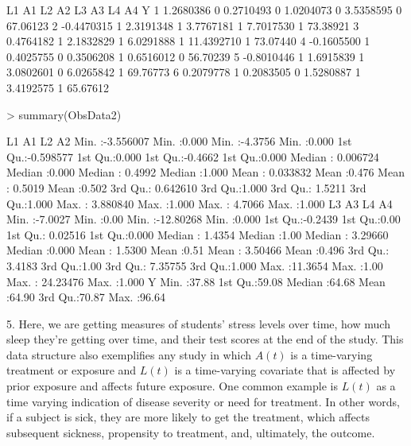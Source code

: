 \documentclass{exam}
\begin{document}
\begin{solution}
\begin{Schunk}
\begin{Soutput}
          L1 A1        L2 A2        L3 A3         L4 A4        Y
1  1.2680386  0 0.2710493  0 1.0204073  0  3.5358595  0 67.06123
2 -0.4470315  1 2.3191348  1 3.7767181  1  7.7017530  1 73.38921
3  0.4764182  1 2.1832829  1 6.0291888  1 11.4392710  1 73.07440
4 -0.1605500  1 0.4025755  0 0.3506208  1  0.6516012  0 56.70239
5 -0.8010446  1 1.6915839  1 3.0802601  0  6.0265842  1 69.76773
6  0.2079778  1 0.2083505  0 1.5280887  1  3.4192575  1 65.67612
\end{Soutput}
\begin{Sinput}
> summary(ObsData2)
\end{Sinput}
\begin{Soutput}
       L1                  A1              L2                A2       
 Min.   :-3.556007   Min.   :0.000   Min.   :-4.3756   Min.   :0.000  
 1st Qu.:-0.598577   1st Qu.:0.000   1st Qu.:-0.4662   1st Qu.:0.000  
 Median : 0.006724   Median :0.000   Median : 0.4992   Median :1.000  
 Mean   : 0.033832   Mean   :0.476   Mean   : 0.5019   Mean   :0.502  
 3rd Qu.: 0.642610   3rd Qu.:1.000   3rd Qu.: 1.5211   3rd Qu.:1.000  
 Max.   : 3.880840   Max.   :1.000   Max.   : 4.7066   Max.   :1.000  
       L3                A3             L4                  A4       
 Min.   :-7.0027   Min.   :0.00   Min.   :-12.80268   Min.   :0.000  
 1st Qu.:-0.2439   1st Qu.:0.00   1st Qu.:  0.02516   1st Qu.:0.000  
 Median : 1.4354   Median :1.00   Median :  3.29660   Median :0.000  
 Mean   : 1.5300   Mean   :0.51   Mean   :  3.50466   Mean   :0.496  
 3rd Qu.: 3.4183   3rd Qu.:1.00   3rd Qu.:  7.35755   3rd Qu.:1.000  
 Max.   :11.3654   Max.   :1.00   Max.   : 24.23476   Max.   :1.000  
       Y        
 Min.   :37.88  
 1st Qu.:59.08  
 Median :64.68  
 Mean   :64.90  
 3rd Qu.:70.87  
 Max.   :96.64  
\end{Soutput}
\end{Schunk}

5. Here, we are getting measures of students' stress levels over time, how much sleep they're getting over time, and their test scores at the end of the study. This data structure also exemplifies any study in which $A(t)$ is a time-varying treatment or exposure and $L(t)$ is a time-varying covariate that is affected by prior exposure and affects future exposure. One common example is $L(t)$ as a time varying indication of disease severity or need for treatment. In other words, if a subject is sick, they are more likely to get the treatment, which affects subsequent sickness, propensity to treatment, and, ultimately, the outcome.


\end{solution}
\end{document}

